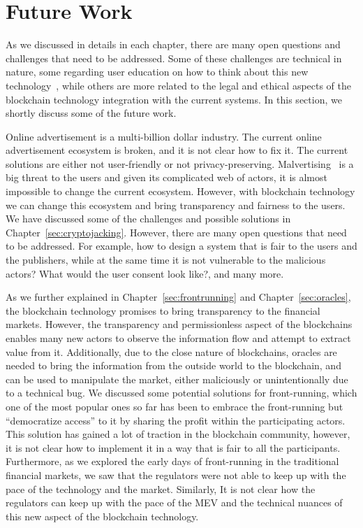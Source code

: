 \section{Future Work}
As we discussed in details in each chapter, there are many open questions and challenges that need to be addressed. Some of these challenges are technical in nature, some regarding user education on how to think about this new technology~\cite{gaggioli2019middleman}, while others are more related to the legal and ethical aspects of the blockchain technology integration with the current systems. In this section, we shortly discuss some of the future work.

Online advertisement is a multi-billion dollar industry. The current online advertisement ecosystem is broken, and it is not clear how to fix it. The current solutions are either not user-friendly or not privacy-preserving. Malvertising~\cite{li2012knowing} is a big threat to the users and given its complicated web of actors, it is almost impossible to change the current ecosystem. However, with blockchain technology we can change this ecosystem and bring transparency and fairness to the users. We have discussed some of the challenges and possible solutions in Chapter~\ref{sec:cryptojacking}. However, there are many open questions that need to be addressed. For example, how to design a system that is fair to the users and the publishers, while at the same time it is not vulnerable to the malicious actors? What would the user consent look like?, and many more.

As we further explained in Chapter~\ref{sec:frontrunning} and Chapter~\ref{sec:oracles}, the blockchain technology promises to bring transparency to the financial markets. However, the transparency and permissionless aspect of the blockchains enables many new actors to observe the information flow and attempt to extract value from it. Additionally, due to the close nature of blockchains, oracles are needed to bring the information from the outside world to the blockchain, and can be used to manipulate the market, either maliciously or unintentionally due to a technical bug. We discussed some potential solutions for front-running, which one of the most popular ones so far has been to embrace the front-running but ``democratize access'' to it by sharing the profit within the participating actors. This solution has gained a lot of traction in the blockchain community, however, it is not clear how to implement it in a way that is fair to all the participants. Furthermore, as we explored the early days of front-running in the traditional financial markets, we saw that the regulators were not able to keep up with the pace of the technology and the market. Similarly, It is not clear how the regulators can keep up with the pace of the MEV and the technical nuances of this new aspect of the blockchain technology.


